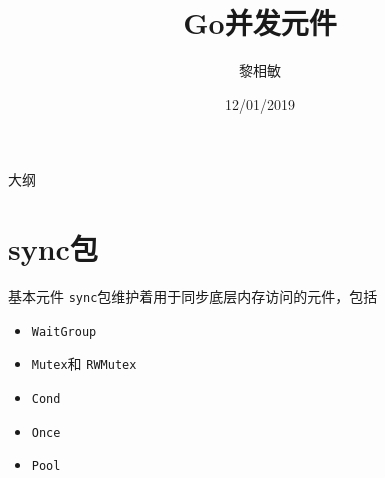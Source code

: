\documentclass{beamer}
\title{Go并发元件}
\author{黎相敏}
\institute{上海观源信息科技有限公司 \\ 上海市闵行区紫竹科技园4号楼303B}
\date{12/01/2019}
\newcommand{\Cond}{\texttt{Cond}}
\newcommand{\Mutex}{\texttt{Mutex}}
\newcommand{\Once}{\texttt{Once}}
\newcommand{\Pool}{\texttt{Pool}}
\newcommand{\RWMutex}{\texttt{RWMutex}}
\newcommand{\WaitGroup}{\texttt{WaitGroup}}
\begin{document}
    \begin{frame}
        \maketitle
    \end{frame}

    \begin{frame}{大纲}
        \tableofcontents
    \end{frame}


    \section{sync包}
\begin{frame}{基本元件}
   \texttt{sync}包维护着用于同步底层内存访问的元件，包括
   \begin{itemize}
       \item \WaitGroup
       \item \Mutex 和 \RWMutex
       \item \Cond
       \item \Once
       \item \Pool
   \end{itemize} 
\end{frame}

    
\end{document}
